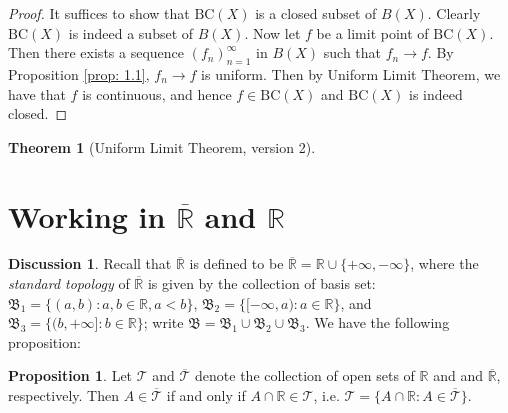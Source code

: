 \documentclass[oneside]{amsart}
\theoremstyle{definition}
\newtheorem{theorem}{Theorem}[section]
\newtheorem{prop}{Proposition}[section]
\newtheorem{disc}{Discussion}[section]
\newcommand{\rr}{\mathbb R}
\begin{document}
\begin{proof}
	It suffices to show that $\text{BC}(X)$ is a closed subset of $B(X)$. Clearly $\text{BC}(X)$ is indeed a subset of $B(X)$. Now let $f$ be a limit point of $\text{BC}(X)$. Then there exists a sequence $(f_n)_{n=1}^\infty$ in $B(X)$ such that $f_n \to f$. By Proposition \ref{prop: 1.1}, $f_n \to f$ is uniform. Then by Uniform Limit Theorem, we have that $f$ is continuous, and hence $f \in \text{BC}(X)$ and $\text{BC}(X)$ is indeed closed. 
\end{proof}
\begin{theorem}[Uniform Limit Theorem, version 2]
\end{theorem}

\section{Working in $\overline{\rr}$ and $\rr$}
\begin{disc} \label{disc: 2.1}
	Recall that $\overline{\rr}$ is defined to be $\overline{\rr} = \rr \cup \{+\infty, -\infty \} $, where the \textit{standard topology} of $\overline{\rr}$ is given by the collection of basis set:  $\mathfrak B_1 = \{ (a, b) \colon a,b \in \rr, a<b \}$, $\mathfrak B_2 = \{ [-\infty, a) \colon a \in \rr \}$, and $\mathfrak B_3 = \{ (b, +\infty] \colon b \in \rr \}$; write $\mathfrak B = \mathfrak B_1 \cup \mathfrak B_2 \cup \mathfrak B_3$. We have the following proposition:
	\begin{prop}
	Let $\mathcal T$ and $\overline{\mathcal T}$ denote the collection of open sets of $\rr$ and and $\overline{\rr}$, respectively. Then $A \in \overline{\mathcal T}$ if and only if $A \cap \rr \in \mathcal T$, i.e. $\mathcal T = \{ A \cap \rr \colon A \in \overline{\mathcal T} \}$.
	\end{prop}
\end{disc}
\end{document}
